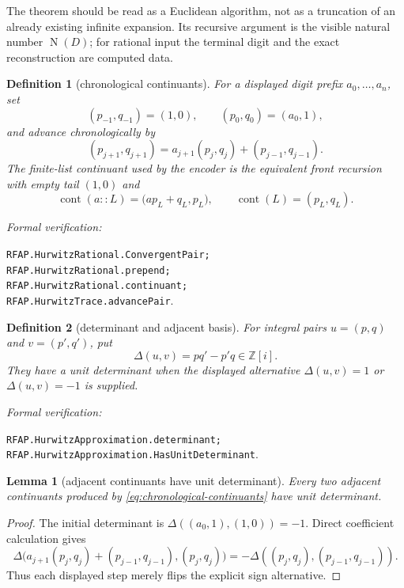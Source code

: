\documentclass[11pt]{article}
\newtheorem{lemma}[lemma]{Lemma}
\newtheorem{definition}[definition]{Definition}
\newcommand{\Zi}{\mathbb{Z}[i]}
\newcommand{\Norm}[1]{\operatorname{N}\!\left(#1\right)}
\newcommand{\leanref}[1]{\par\smallskip\noindent
  \emph{Formal verification:}\par\nobreak
  {\raggedright\nolinkurl{#1}.\par}}
\begin{document}
The theorem should be read as a Euclidean algorithm, not as a truncation of
an already existing infinite expansion.  Its recursive argument is the
visible natural number $\Norm D$; for rational input the terminal digit and
the exact reconstruction are computed data.

\begin{definition}[chronological continuants]
\label{def:chronological-continuants}
For a displayed digit prefix $a_0,\ldots,a_n$, set
\[
 (p_{-1},q_{-1})=(1,0),\qquad (p_0,q_0)=(a_0,1),
\]
and advance chronologically by
\begin{equation}
\label{eq:chronological-continuants}
 (p_{j+1},q_{j+1})=
 a_{j+1}(p_j,q_j)+(p_{j-1},q_{j-1}).
\end{equation}
The finite-list continuant used by the encoder is the equivalent front
recursion with empty tail $(1,0)$ and
\[
           \operatorname{cont}(a::L)
            =\bigl(a p_L+q_L,p_L\bigr),
 \qquad \operatorname{cont}(L)=(p_L,q_L).
\]
\end{definition}

\leanref{RFAP.HurwitzRational.ConvergentPair;
RFAP.HurwitzRational.prepend;
RFAP.HurwitzRational.continuant;
RFAP.HurwitzTrace.advancePair}

\begin{definition}[determinant and adjacent basis]
\label{def:adjacent-basis}
For integral pairs $u=(p,q)$ and $v=(p',q')$, put
\[
                       \Delta(u,v)=pq'-p'q\in\Zi.
\]
They have a \emph{unit determinant} when the displayed alternative
$\Delta(u,v)=1$ or $\Delta(u,v)=-1$ is supplied.
\end{definition}

\leanref{RFAP.HurwitzApproximation.determinant;
RFAP.HurwitzApproximation.HasUnitDeterminant}

\begin{lemma}[adjacent continuants have unit determinant]
\label{lem:continuant-determinant}
Every two adjacent continuants produced by
\eqref{eq:chronological-continuants} have unit determinant.
\end{lemma}

\begin{proof}
The initial determinant is
$\Delta((a_0,1),(1,0))=-1$.  Direct coefficient calculation gives
\[
 \Delta\bigl(a_{j+1}(p_j,q_j)+(p_{j-1},q_{j-1}),
              (p_j,q_j)\bigr)
      =-\Delta((p_j,q_j),(p_{j-1},q_{j-1})).
\]
Thus each displayed step merely flips the explicit sign alternative.
\end{proof}
\end{document}
